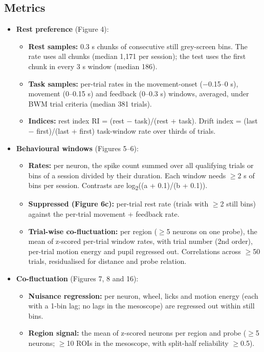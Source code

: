 \documentclass[10pt,a4paper]{article}
\begin{document}
\subsection{Metrics}
\begin{itemize}
\item \textbf{Rest preference} (Figure 4): 
\begin{itemize}
\item \textbf{Rest samples:} 0.3 s chunks of consecutive still grey-screen bins. The rate uses all chunks (median 1,171 per session); the test uses the first chunk in every 3 s window (median 186).
\item \textbf{Task samples:} per-trial rates in the movement-onset ($-$0.15--0 s), movement (0--0.15 s) and feedback (0--0.3 s) windows, averaged, under BWM trial criteria (median 381 trials).
\item \textbf{Indices:} rest index RI = (rest $-$ task)/(rest + task). Drift index = (last $-$ first)/(last + first) task-window rate over thirds of trials.
\end{itemize}
\item \textbf{Behavioural windows} (Figures 5--6): 
\begin{itemize}
\item \textbf{Rates:} per neuron, the spike count summed over all qualifying trials or bins of a session divided by their duration. Each window needs $\geq$2 s of bins per session. Contrasts are log\textsubscript{2}((a + 0.1)/(b + 0.1)).
\item \textbf{Suppressed (Figure 6c):} per-trial rest rate (trials with $\geq$2 still bins) against the per-trial movement + feedback rate.
\item \textbf{Trial-wise co-fluctuation:} per region ($\geq$5 neurons on one probe), the mean of z-scored per-trial window rates, with trial number (2nd order), per-trial motion energy and pupil regressed out. Correlations across $\geq$50 trials, residualised for distance and probe relation.
\end{itemize}
\item \textbf{Co-fluctuation} (Figures 7, 8 and 16): 
\begin{itemize}
\item \textbf{Nuisance regression:} per neuron, wheel, licks and motion energy (each with a 1-bin lag; no lags in the mesoscope) are regressed out within still bins.
\item \textbf{Region signal:} the mean of z-scored neurons per region and probe ($\geq$5 neurons; $\geq$10 ROIs in the mesoscope, with split-half reliability $\geq$0.5).

\end{itemize}
\end{itemize}
\end{document}
